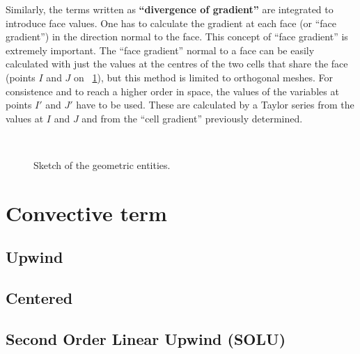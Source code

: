 Similarly, the terms written as \textbf{``divergence of gradient''} are
integrated to introduce face values. One has to calculate the gradient at
each face (or ``face gradient'') in the direction normal to the face. This
concept of ``face gradient'' is extremely important. The ``face gradient''
normal to a face can be easily calculated with just the values at the
centres of the two cells that share the face (points $I$ and $J$ on 
\figurename~\ref{fig:sketch_internal_external_faces}),%
but this method is limited to orthogonal meshes.
For consistence and to reach a higher order in space, the values of the
variables at points $I'$ and $J'$ have to be used. These are calculated by a
Taylor series from the values at $I$ and $J$ and from the ``cell gradient''
previously determined.

\begin{figure}[t]
\centering
\mbox{
 \,
}%
\caption{Sketch of the geometric entities.}
\label{fig:sketch_internal_external_faces}
\end{figure}


\section{Convective term}

\subsection{Upwind}

\subsection{Centered}

\subsection{Second Order Linear Upwind (SOLU)}


